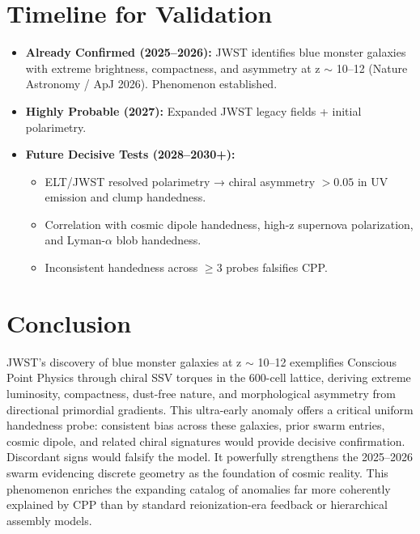 \documentclass[11pt]{article}
\begin{document}
\section{Timeline for Validation}
\begin{itemize}
    \item \textbf{Already Confirmed (2025--2026):} JWST identifies blue monster galaxies with extreme brightness, compactness, and asymmetry at z $\sim$ 10--12 (Nature Astronomy / ApJ 2026). Phenomenon established.
    \item \textbf{Highly Probable (2027):} Expanded JWST legacy fields + initial polarimetry.
    \item \textbf{Future Decisive Tests (2028--2030+):}
    \begin{itemize}
        \item ELT/JWST resolved polarimetry → chiral asymmetry $>0.05$ in UV emission and clump handedness.
        \item Correlation with cosmic dipole handedness, high-z supernova polarization, and Lyman-$\alpha$ blob handedness.
        \item Inconsistent handedness across $\geq 3$ probes falsifies CPP.
    \end{itemize}
\end{itemize}

\section{Conclusion}
JWST's discovery of blue monster galaxies at z $\sim$ 10--12 exemplifies Conscious Point Physics through chiral SSV torques in the 600-cell lattice, deriving extreme luminosity, compactness, dust-free nature, and morphological asymmetry from directional primordial gradients.  
This ultra-early anomaly offers a critical uniform handedness probe: consistent bias across these galaxies, prior swarm entries, cosmic dipole, and related chiral signatures would provide decisive confirmation. Discordant signs would falsify the model. It powerfully strengthens the 2025--2026 swarm evidencing discrete geometry as the foundation of cosmic reality.  
This phenomenon enriches the expanding catalog of anomalies far more coherently explained by CPP than by standard reionization-era feedback or hierarchical assembly models.
\end{document}
